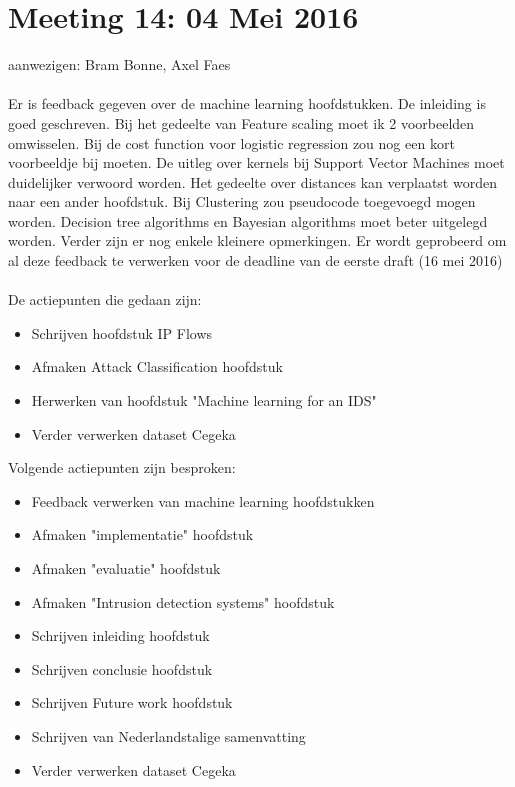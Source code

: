 \section{Meeting 14: 04 Mei 2016}
aanwezigen: Bram Bonne, Axel Faes \\
\\
Er is feedback gegeven over de machine learning hoofdstukken. De inleiding is goed geschreven. Bij het gedeelte van Feature scaling moet ik 2 voorbeelden omwisselen. Bij de cost function voor logistic regression zou nog een kort voorbeeldje bij moeten. De uitleg over kernels bij Support Vector Machines moet duidelijker verwoord worden. Het gedeelte over distances kan verplaatst worden naar een ander hoofdstuk. Bij Clustering zou pseudocode toegevoegd mogen worden. Decision tree algorithms en Bayesian algorithms moet beter uitgelegd worden. Verder zijn er nog enkele kleinere opmerkingen. Er wordt geprobeerd om al deze feedback te verwerken voor de deadline van de eerste draft (16 mei 2016)\\
\\
De actiepunten die gedaan zijn:
\begin{itemize}  
		\item Schrijven hoofdstuk IP Flows
		\item Afmaken Attack Classification hoofdstuk
		\item Herwerken van hoofdstuk "Machine learning for an IDS"
        \item Verder verwerken dataset Cegeka
\end{itemize}

Volgende actiepunten zijn besproken:
\begin{itemize}  		
		\item Feedback verwerken van machine learning hoofdstukken
		\item Afmaken "implementatie" hoofdstuk
		\item Afmaken "evaluatie" hoofdstuk
		\item Afmaken "Intrusion detection systems" hoofdstuk
		\item Schrijven inleiding hoofdstuk
		\item Schrijven conclusie hoofdstuk
		\item Schrijven Future work hoofdstuk
		\item Schrijven van Nederlandstalige samenvatting
        \item Verder verwerken dataset Cegeka
\end{itemize}
